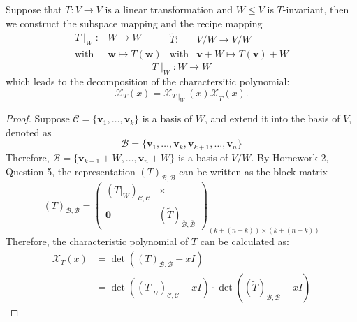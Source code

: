 \begin{proposition}
Suppose that $T:V\to V$ is a linear transformation and 
$W\le V$ is $T$-invariant, then we construct the subspace mapping and the recipe mapping
\begin{subequations}
\begin{equation}
\begin{array}{ll}
T\mid_W:&W\to W\\
\text{with}&\bm w\mapsto T(\bm w)
\end{array}
\end{equation}
\begin{equation}
\begin{array}{ll}
\tilde{T}:&V/W\to V/W\\
\text{with}&\bm v+W\mapsto T(\bm v)+W
\end{array}
\end{equation}
\end{subequations}
\[
T\mid_W:W\to W
\]
which leads to the decomposition of the charactersitic polynomial:
\[
\mathcal{X}_T(x) = \mathcal{X}_{T\mid_W}(x)\mathcal{X}_{\tilde{T}}(x).
\]
\end{proposition}
\begin{proof}
Suppose $\mathcal{C} = \{\bm v_1,\dots,\bm v_k\}$ is a basis of $W$, and extend it into the basis of $V$, denoted as 
\[
\mathcal{B}=\{\bm v_1,\dots,\bm v_k,\bm v_{k+1},\dots,\bm v_n\}
\]
Therefore, $\overline{\mathcal{B}} = \{\bm v_{k+1}+W,\dots,\bm v_n+W\}$ is a basis of $V/W$.
By Homework 2, Question 5, the representation $(T)_{\mathcal{B},\mathcal{B}}$ can be written as the block matrix
\[
(T)_{\mathcal{B},\mathcal{B}} = \begin{pmatrix}
(T|_{W})_{\mathcal{C},\mathcal{C}}&\times\\
\bm0&(\tilde{T})_{\overline{\mathcal{B}},\overline{\mathcal{B}}}
\end{pmatrix}_{(k+(n-k))\times(k+(n-k))}
\]
Therefore, the characteristic polynomial of $T$ can be calculated as:
\begin{align*}
\mathcal{X}_T(x)&= \det((T)_{\mathcal{B},\mathcal{B}} - xI)\\
&=\det((T|_{U})_{\mathcal{C},\mathcal{C}} - xI)\cdot\det((\tilde{T})_{\overline{\mathcal{B}},\overline{\mathcal{B}}} - xI)
\end{align*}
\end{proof}


